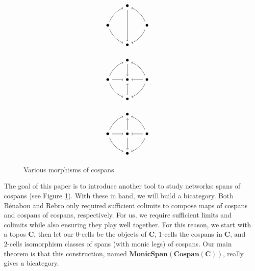 \documentclass[11pt]{amsart}
\newcommand{\cat}[1]{\mathbf{#1}}
\theoremstyle{remark}
\theoremstyle{definition}
\begin{document}
\begin{figure}
	\centering	
	\begin{minipage}[b]{0.3\textwidth}
	\[
	\begin{tikzpicture}
		\node (a) at (0,1) {$\bullet$};
		\node (b) at (1,0) {$\bullet$};
		\node (c) at (0,-1) {$\bullet$};
		\node (d) at (-1,0) {$\bullet$};
		\draw [<-] (a) edge[bend left=20] (b);
		\draw [->] (b) edge[bend left=20] (c);
		\draw [<-] (c) edge[bend left=20] (d);
		\draw [->] (d) edge[bend left=20] (a);
		\draw [->] (a) edge[] (c);
	\end{tikzpicture}
	\]
	\label{fig.MapOfCospans}
	\end{minipage}
	\begin{minipage}[b]{0.3\textwidth}
	\[
	\begin{tikzpicture}
	\node (a) at (0,1) {$\bullet$};
	\node (b) at (1,0) {$\bullet$};
	\node (c) at (0,-1) {$\bullet$};
	\node (d) at (-1,0) {$\bullet$};
	\node (e) at (0,0) {$\bullet$};
	\draw [<-] (a) edge[bend left=20] (b);
	\draw [->] (b) edge[bend left=20] (c);
	\draw [<-] (c) edge[bend left=20] (d);
	\draw [->] (d) edge[bend left=20] (a);
	\draw [->] (a) edge (e);
	\draw [->] (b) edge (e);
	\draw [->] (c) edge (e);
	\draw [->] (d) edge (e);
	\end{tikzpicture}
	\]
	\label{fig.CospanOfCospans}
	\end{minipage}
	\begin{minipage}[b]{0.3\textwidth}
	\[
	\begin{tikzpicture}
	\node (a) at (0,1) {$\bullet$};
	\node (b) at (1,0) {$\bullet$};
	\node (c) at (0,-1) {$\bullet$};
	\node (d) at (-1,0) {$\bullet$};
	\node (e) at (0,0) {$\bullet$};
	\draw [<-] (a) edge[bend left=20] (b);
	\draw [->] (b) edge[bend left=20] (c);
	\draw [<-] (c) edge[bend left=20] (d);
	\draw [->] (d) edge[bend left=20] (a);
	\draw [<-] (a) edge (e);
	\draw [->] (b) edge (e);
	\draw [<-] (c) edge (e);
	\draw [->] (d) edge (e);
	\end{tikzpicture}
	\]
	\label{fig.SpanOfCospans}
\end{minipage}
\caption{Various morphisms of cospans}
\end{figure}

The goal of this paper is to introduce another tool to study networks: spans of cospans (see Figure \ref{fig.SpanOfCospans}). With these in hand, we will build a bicategory.  Both B\'{e}nabou and Rebro only required sufficient colimits to compose maps of cospans and cospans of cospans, respectively. For us, we require sufficient limits and colimits while also ensuring they play well together. For this reason, we start with a topos $\cat{C}$, then let our $0$-cells be the objects of $\cat{C}$, $1$-cells the cospans in $\cat{C}$, and $2$-cells isomorphism classes of spans (with monic legs) of cospans. Our main theorem is that this construction, named $\cat{MonicSpan(Cospan(C))}$, really gives a bicategory. 
\end{document}
